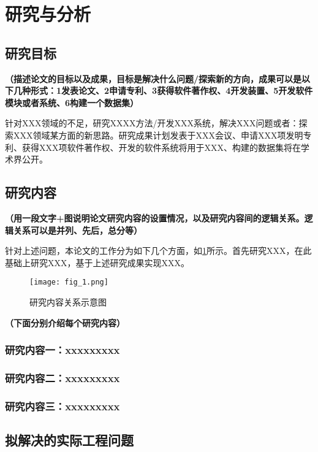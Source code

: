 \section{研究与分析}

\subsection{研究目标}

\textbf{\color{red}（描述论文的目标以及成果，目标是解决什么问题/探索新的方向，成果可以是以下几种形式：1发表论文、2申请专利、3获得软件著作权、4开发装置、5开发软件模块或者系统、6构建一个数据集）}

针对XXX领域的不足，研究XXXX方法/开发XXX系统，解决XXX问题或者：探索XXX领域某方面的新思路。研究成果计划发表于XXX会议、申请XXX项发明专利、获得XXX项软件著作权、开发的软件系统将用于XXX、构建的数据集将在学术界公开。

\subsection{研究内容}

\textbf{\color{red}（用一段文字+图说明论文研究内容的设置情况，以及研究内容间的逻辑关系。逻辑关系可以是并列、先后，总分等）}

针对上述问题，本论文的工作分为如下几个方面，如\cref{fig_1}所示。首先研究XXX，在此基础上研究XXX，基于上述研究成果实现XXX。

\begin{figure}[!ht]
	\centering
	\texttt{[image: fig\_1.png]}
	\caption{研究内容关系示意图}
	\label{fig_1}
\end{figure}

\textbf{\color{red}（下面分别介绍每个研究内容）}

\subsubsection{研究内容一：xxxxxxxxx}

\subsubsection{研究内容二：xxxxxxxxx}

\subsubsection{研究内容三：xxxxxxxxx}


\subsection{拟解决的实际工程问题}


